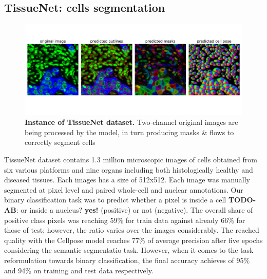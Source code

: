 \documentclass{article}
\newcommand{\todo}[2]{{\color{red} {\bf TODO-#1}: #2}}
\begin{document}
\subsection{TissueNet: cells segmentation}

\begin{figure}
	\advance\leftskip-0.5cm
	\includegraphics[width=8in]{img/tissuenet.pdf}
	\caption{{\bf Instance of TissueNet dataset.} Two-channel original images are being processed by the model, in turn producing masks \& flows to correctly segment cells}
	\label{fig:tissue_example}
\end{figure} 

TissueNet dataset contains 1.3 million microscopic images of cells obtained from six various platforms and nine organs including both histologically healthy and diseased tissues. Each images has a size of 512x512. Each image was manually segmented at pixel level and paired whole-cell and nuclear annotations. Our binary classification task was to predict whether a pixel is inside a cell \todo{AB}{or inside a nucleus?} {\bf yes!} (positive) or not (negative). The overall share of positive class pixels was reaching 59\% for train data against already 66\% for those of test; however, the ratio varies over the images considerably. The reached quality with the Cellpose model \cite{cellpose} reaches 77\%  of average precision after five epochs considering the semantic segmentatio task. However, when it comes to the task reformulation towards binary classification, the final accuracy achieves of 95\% and 94\% on training and test data respectively.
\end{document}
